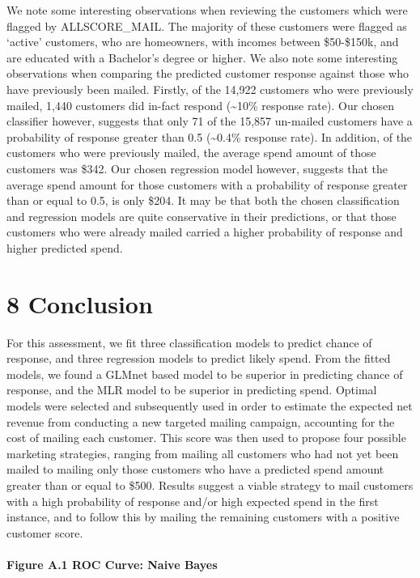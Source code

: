 \documentclass[]{article}
\let\oldparagraph\paragraph
\renewcommand{\paragraph}[1]{\oldparagraph{#1}\mbox{}}
\begin{document}
We note some interesting observations when reviewing the customers which
were flagged by ALLSCORE\_MAIL. The majority of these customers were
flagged as `active' customers, who are homeowners, with incomes between
\$50-\$150k, and are educated with a Bachelor's degree or higher. We
also note some interesting observations when comparing the predicted
customer response against those who have previously been mailed.
Firstly, of the 14,922 customers who were previously mailed, 1,440
customers did in-fact respond (\textasciitilde{}10\% response rate). Our
chosen classifier however, suggests that only 71 of the 15,857 un-mailed
customers have a probability of response greater than 0.5
(\textasciitilde{}0.4\% response rate). In addition, of the customers
who were previously mailed, the average spend amount of those customers
was \$342. Our chosen regression model however, suggests that the
average spend amount for those customers with a probability of response
greater than or equal to 0.5, is only \$204. It may be that both the
chosen classification and regression models are quite conservative in
their predictions, or that those customers who were already mailed
carried a higher probability of response and higher predicted spend.

\section{8 Conclusion}\label{conclusion}

For this assessment, we fit three classification models to predict
chance of response, and three regression models to predict likely spend.
From the fitted models, we found a GLMnet based model to be superior in
predicting chance of response, and the MLR model to be superior in
predicting spend. Optimal models were selected and subsequently used in
order to estimate the expected net revenue from conducting a new
targeted mailing campaign, accounting for the cost of mailing each
customer. This score was then used to propose four possible marketing
strategies, ranging from mailing all customers who had not yet been
mailed to mailing only those customers who have a predicted spend amount
greater than or equal to \$500. Results suggest a viable strategy to
mail customers with a high probability of response and/or high expected
spend in the first instance, and to follow this by mailing the remaining
customers with a positive customer score.

\newpage

\paragraph{Figure A.1 ROC Curve: Naive
Bayes}\label{figure-a.1-roc-curve-naive-bayes}
\end{document}
